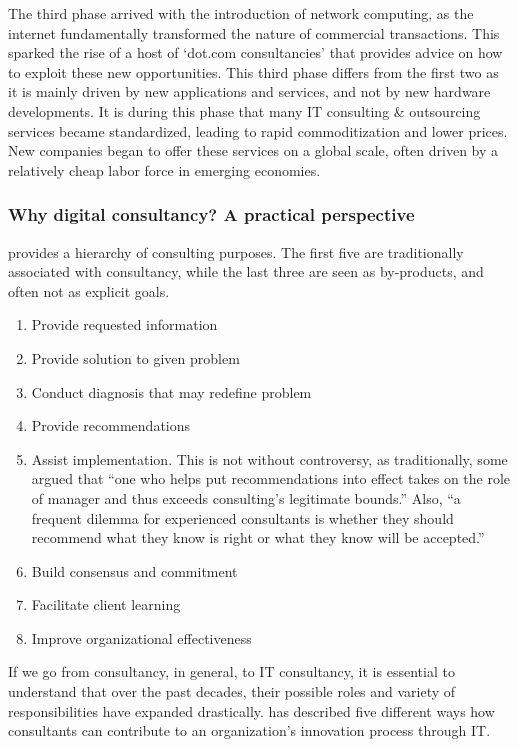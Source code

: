 \documentclass[12pt]{article}
\providecommand{\tightlist}{%
  \setlength{\itemsep}{0pt}\setlength{\parskip}{0pt}}
\begin{document}
The third phase arrived with the introduction of network computing, as
the internet fundamentally transformed the nature of commercial
transactions. This sparked the rise of a host of `dot.com consultancies'
that provides advice on how to exploit these new opportunities. This
third phase differs from the first two as it is mainly driven by new
applications and services, and not by new hardware developments. It is
during this phase that many IT consulting \& outsourcing services became
standardized, leading to rapid commoditization and lower prices. New
companies began to offer these services on a global scale, often driven
by a relatively cheap labor force in emerging economies.

\hypertarget{why-digital-consultancy-a-practical-perspective}{%
\subsubsection{Why digital consultancy? A practical
perspective}\label{why-digital-consultancy-a-practical-perspective}}

\citet{turner1982} provides a hierarchy of consulting purposes. The
first five are traditionally associated with consultancy, while the last
three are seen as by-products, and often not as explicit goals.

\begin{enumerate}
\def\labelenumi{\arabic{enumi}.}
\tightlist
\item
  Provide requested information
\item
  Provide solution to given problem
\item
  Conduct diagnosis that may redefine problem
\item
  Provide recommendations
\item
  Assist implementation. This is not without controversy, as
  traditionally, some argued that ``one who helps put recommendations
  into effect takes on the role of manager and thus exceeds consulting's
  legitimate bounds.'' Also, ``a frequent dilemma for experienced
  consultants is whether they should recommend what they know is right
  or what they know will be accepted.''
\item
  Build consensus and commitment
\item
  Facilitate client learning
\item
  Improve organizational effectiveness
\end{enumerate}

If we go from consultancy, in general, to IT consultancy, it is
essential to understand that over the past decades, their possible roles
and variety of responsibilities have expanded drastically.
\citet[20-25]{swanson2010} has described five different ways how
consultants can contribute to an organization's innovation process
through IT.
\end{document}
